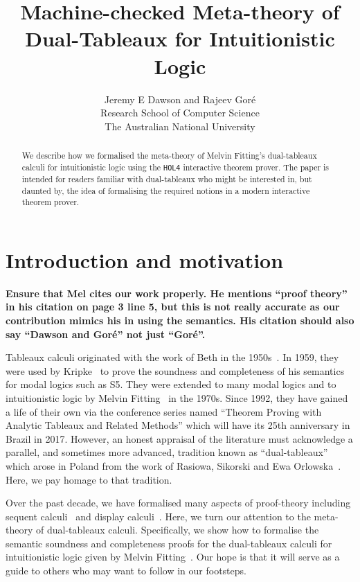 \documentclass[a4paper]{article}
\title{Machine-checked Meta-theory of Dual-Tableaux for Intuitionistic
Logic}
\author{Jeremy E Dawson and Rajeev Gor\'e
\\ Research School of Computer Science
\\  The Australian National University}
\date{}
\newcommand{\hol}{\texttt{HOL4}}
\begin{document}
\maketitle

\begin{abstract}
  We describe how we formalised the meta-theory of Melvin Fitting's
  dual-tableaux calculi for intuitionistic logic using the \hol{}
  interactive theorem prover. The paper is intended for readers
  familiar with dual-tableaux  who might be interested in, but daunted
  by, the idea of
  formalising the required notions in a modern interactive theorem
  prover. 
\end{abstract}  

\tableofcontents

\newpage
\section{Introduction and motivation}

\textbf{Ensure that Mel cites our work properly. He mentions ``proof
  theory'' in his citation on page 3 line 5, but this is not really
  accurate as our contribution mimics his in using the semantics. His
  citation should also say ``Dawson and Gor\'e'' not just ``Gor\'e''.}

Tableaux calculi originated with the work of Beth in the
1950s~\cite{beth-padoas}. In 1959, they were used by
Kripke~\cite{kripke-completeness} to prove the soundness and
completeness of his semantics for modal logics such as S5.  They were
extended to many modal logics and to intuitionistic logic by Melvin
Fitting~\cite{fitting-proof} in the 1970s. Since 1992, they have
gained a life of their own via the conference series named ``Theorem
Proving with Analytic Tableaux and Related Methods'' which will have
its 25th anniversary in Brazil in 2017. However, an honest appraisal
of the literature must acknowledge a parallel, and sometimes more
advanced, tradition known as ``dual-tableaux'' which arose in Poland
from the work of Rasiowa, Sikorski and Ewa
Orlowska~\cite{orlowska-joanna-book}.  Here, we pay homage to that
tradition.

Over the past decade, we have formalised many aspects
of proof-theory including sequent
calculi~\cite{DBLP:conf/lpar/DawsonG10} and display
calculi~\cite{dawson-gore-formalised-cut-admissibility}. Here, we turn
our attention to the meta-theory of dual-tableaux
calculi. Specifically, we show how to formalise the semantic soundness
and completeness proofs for the dual-tableaux
calculi for intuitionistic logic given by Melvin
Fitting~\cite{fitting-dual-tableau}.  Our hope is that it will serve
as a guide to others who may want to follow in our footsteps.
\end{document}
